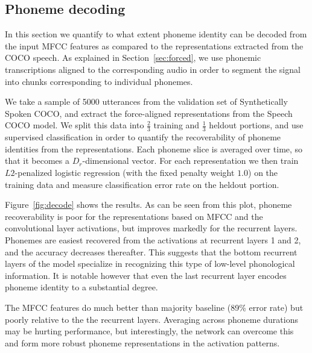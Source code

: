\subsection{Phoneme decoding}
\label{sec:decoding}
In this section we quantify to what extent phoneme identity can be
decoded from  the input MFCC features as compared to the
representations extracted from the COCO speech. As explained in 
Section~\ref{sec:forced}, we use phonemic
transcriptions aligned to the corresponding audio in order to segment
 the signal into chunks corresponding to individual phonemes.

We take a sample of 5000 utterances from the validation set of
Synthetically Spoken COCO, and extract the force-aligned
representations from the Speech COCO model.
We split this data into $\frac{2}{3}$ training and
$\frac{1}{3}$ heldout portions, and use supervised classification in
order to quantify the recoverability of phoneme identities from the
representations. Each phoneme slice is averaged over time, so that it
becomes a $D_r$-dimensional vector. For each representation we then
train $L2$-penalized logistic regression (with the fixed penalty
weight $1.0$) on the training data and measure classification error rate
on the heldout portion. 

Figure~\ref{fig:decode} shows the results. As can be seen from this plot, phoneme recoverability 
is poor for the representations based on MFCC and the convolutional layer activations, but improves markedly for 
the recurrent layers. Phonemes are easiest recovered from the activations at recurrent
layers 1 and 2, and the accuracy decreases thereafter. This suggests
that the bottom recurrent layers of the model specialize in recognizing this
type of low-level phonological information. It is notable however that
even the last recurrent layer encodes phoneme identity to a
substantial degree.

The MFCC features do much better than majority baseline (89\% error rate) but
poorly relative to the the recurrent layers. Averaging across
phoneme durations may be hurting performance, but interestingly, the
network can overcome this and form more robust phoneme representations in 
the activation patterns.

